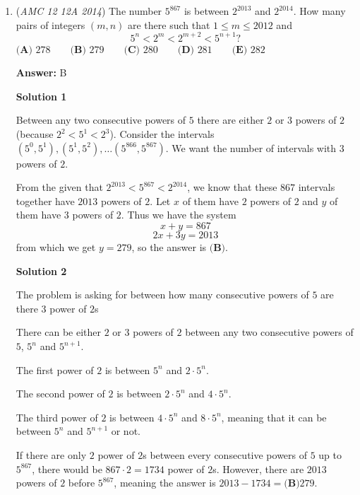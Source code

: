 \begin{enumerate}
 \href{https://artofproblemsolving.com/videos/amc/2014amc12a/380}{https://artofproblemsolving.com/videos/amc/2014amc12a/380}

 (The video is no longer available on YouTube)

 


	\item (\textit{AMC 12 12A 2014}) The number $5^{867}$ is between $2^{2013}$ and $2^{2014}$.  How many pairs of integers $(m,n)$ are there such that $1\leq m\leq 2012$ and 
 \[5^n<2^m<2^{m+2}<5^{n+1}?\]
$\textbf{(A) }278\qquad \textbf{(B) }279\qquad \textbf{(C) }280\qquad \textbf{(D) }281\qquad \textbf{(E) }282\qquad$

 \textbf{Answer: }B



\textbf{Solution 1}

Between any two consecutive powers of $5$ there are either $2$ or $3$ powers of $2$ (because $2^2<5^1<2^3$). Consider the intervals $(5^0,5^1),(5^1,5^2),\dots (5^{866},5^{867})$. We want the number of intervals with $3$ powers of $2$.

 From the given that $2^{2013}<5^{867}<2^{2014}$, we know that these $867$ intervals together have $2013$ powers of $2$. Let $x$ of them have $2$ powers of $2$ and $y$ of them have $3$ powers of $2$. Thus we have the system
 \[x+y=867\]
 \[2x+3y=2013\]from which we get $y=279$, so the answer is $\boxed{\textbf{(B)}}$.

 



\textbf{Solution 2}

The problem is asking for between how many consecutive powers of $5$ are there $3$ power of $2$s

 There can be either $2$ or $3$ powers of $2$ between any two consecutive powers of $5$, $5^n$ and $5^{n+1}$. 

 The first power of $2$ is between $5^n$ and $2 \cdot 5^n$.

 The second power of $2$ is between $2 \cdot 5^n$ and $4 \cdot 5^n$.

 The third power of $2$ is between $4 \cdot 5^n$ and $8 \cdot 5^n$, meaning that it can be between $5^n$ and $5^{n+1}$ or not.

 If there are only $2$ power of $2$s between every consecutive powers of $5$ up to $5^{867}$, there would be $867\cdot 2 = 1734$ power of $2$s. However, there are $2013$ powers of $2$ before  $5^{867}$, meaning the answer is $2013 - 1734 = \boxed{\textbf{(B)}279}$.


\end{enumerate}
